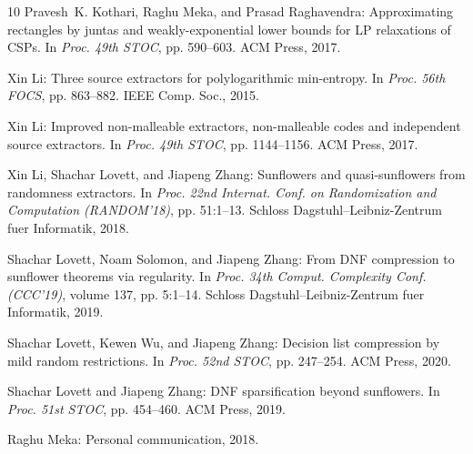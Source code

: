 \documentclass[11pt]{article}
\numberwithin{equation}{section}
\theoremstyle{definition}
\theoremstyle{plain}
\begin{document}
\begin{thebibliography}{10}
{\sc Pravesh~K. Kothari, Raghu Meka, and Prasad Raghavendra}: Approximating
  rectangles by juntas and weakly-exponential lower bounds for {LP} relaxations
  of {CSP}s.
\newblock In {\em Proc. 49th STOC}, pp. 590--603. ACM Press, 2017.

{\sc Xin Li}: Three source extractors for polylogarithmic min-entropy.
\newblock In {\em Proc. 56th FOCS}, pp. 863--882. IEEE Comp. Soc., 2015.

{\sc Xin Li}: Improved non-malleable extractors, non-malleable codes and
  independent source extractors.
\newblock In {\em Proc. 49th STOC}, pp. 1144--1156. ACM Press, 2017.

{\sc Xin Li, Shachar Lovett, and Jiapeng Zhang}: Sunflowers and
  quasi-sunflowers from randomness extractors.
\newblock In {\em Proc. 22nd Internat. Conf. on Randomization and Computation
  (RANDOM'18)}, pp. 51:1--13. Schloss Dagstuhl--Leibniz-Zentrum fuer
  Informatik, 2018.

{\sc Shachar Lovett, Noam Solomon, and Jiapeng Zhang}: From {DNF} compression
  to sunflower theorems via regularity.
\newblock In {\em Proc. 34th Comput. Complexity Conf. (CCC'19)}, volume 137,
  pp. 5:1--14. Schloss Dagstuhl--Leibniz-Zentrum fuer Informatik, 2019.

{\sc Shachar Lovett, Kewen Wu, and Jiapeng Zhang}: Decision list compression by
  mild random restrictions.
\newblock In {\em Proc. 52nd STOC}, pp. 247--254. ACM Press, 2020.

{\sc Shachar Lovett and Jiapeng Zhang}: {DNF} sparsification beyond sunflowers.
\newblock In {\em Proc. 51st STOC}, pp. 454--460. ACM Press, 2019.

{\sc Raghu Meka}: Personal communication, 2018.


\end{thebibliography}
\end{document}
